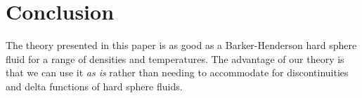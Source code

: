 \documentclass[letterpaper,twocolumn,amsmath,amssymb,prb]{revtex4-1}
\begin{document}

\section{Conclusion}

The theory presented in this paper is as good as a Barker-Henderson
hard sphere fluid for a range of densities and temperatures. The
advantage of our theory is that we can use it \emph{as is} rather than
needing to accommodate for discontinuities and delta functions of hard
sphere fluids.


 
\end{document}
